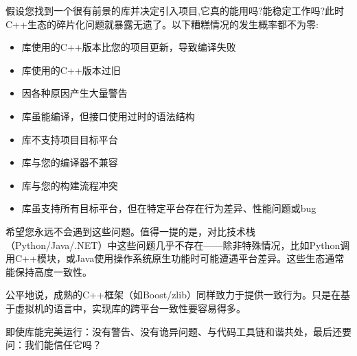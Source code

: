 假设您找到一个很有前景的库并决定引入项目,它真的能用吗?能稳定工作吗?此时C++生态的碎片化问题就暴露无遗了。以下糟糕情况的发生概率都不为零:

\begin{itemize}
\item 
库使用的C++版本比您的项目更新，导致编译失败

\item 
库使用的C++版本过旧

\item 
因各种原因产生大量警告

\item 
库虽能编译，但接口使用过时的语法结构

\item 
库不支持项目目标平台

\item 
库与您的编译器不兼容

\item 
库与您的构建流程冲突

\item 
库虽支持所有目标平台，但在特定平台存在行为差异、性能问题或bug
\end{itemize}

希望您永远不会遇到这些问题。值得一提的是，对比技术栈（Python/Java/.NET）中这些问题几乎不存在——除非特殊情况，比如Python调用C++模块，或Java使用操作系统原生功能时可能遭遇平台差异。这些生态通常能保持高度一致性。

公平地说，成熟的C++框架（如Boost/zlib）同样致力于提供一致行为。只是在基于虚拟机的语言中，实现库的跨平台一致性要容易得多。

即使库能完美运行：没有警告、没有诡异问题、与代码工具链和谐共处，最后还要问：我们能信任它吗？











